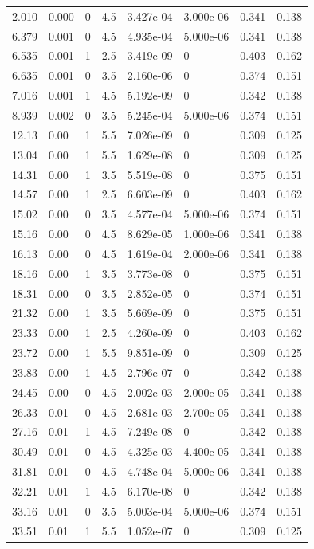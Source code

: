 \documentclass[preview]{standalone}
\begin{document}
{{\begin{tabular}{L{1.2cm}C{1.2cm} C{0.3cm}C{0.5cm} C{1.4cm}C{1.4cm} C{1.4cm}C{1.4cm}}
  2.010  &  0.000  & 0     & 4.5 &  3.427e-04  & 3.000e-06  & 0.341 &  0.138   \\ 
  6.379  &  0.001  & 0     & 4.5 &  4.935e-04  & 5.000e-06  & 0.341 &  0.138   \\ 
  6.535  &  0.001  & 1     & 2.5 &  3.419e-09  & 0  & 0.403 &  0.162   \\ 
  6.635  &  0.001  & 0     & 3.5 &  2.160e-06  & 0  & 0.374 &  0.151   \\ 
  7.016  &  0.001  & 1     & 4.5 &  5.192e-09  & 0  & 0.342 &  0.138   \\ 
  8.939  &  0.002  & 0     & 3.5 &  5.245e-04  & 5.000e-06  & 0.374 &  0.151   \\ 
  12.13  &  0.00  & 1     & 5.5 &  7.026e-09  & 0  & 0.309 &  0.125   \\ 
  13.04  &  0.00  & 1     & 5.5 &  1.629e-08  & 0  & 0.309 &  0.125   \\ 
  14.31  &  0.00  & 1     & 3.5 &  5.519e-08  & 0  & 0.375 &  0.151   \\ 
  14.57  &  0.00  & 1     & 2.5 &  6.603e-09  & 0  & 0.403 &  0.162   \\ 
  15.02  &  0.00  & 0     & 3.5 &  4.577e-04  & 5.000e-06  & 0.374 &  0.151   \\ 
  15.16  &  0.00  & 0     & 4.5 &  8.629e-05  & 1.000e-06  & 0.341 &  0.138   \\ 
  16.13  &  0.00  & 0     & 4.5 &  1.619e-04  & 2.000e-06  & 0.341 &  0.138   \\ 
  18.16  &  0.00  & 1     & 3.5 &  3.773e-08  & 0  & 0.375 &  0.151   \\ 
  18.31  &  0.00  & 0     & 3.5 &  2.852e-05  & 0  & 0.374 &  0.151   \\ 
  21.32  &  0.00  & 1     & 3.5 &  5.669e-09  & 0  & 0.375 &  0.151   \\ 
  23.33  &  0.00  & 1     & 2.5 &  4.260e-09  & 0  & 0.403 &  0.162   \\ 
  23.72  &  0.00  & 1     & 5.5 &  9.851e-09  & 0  & 0.309 &  0.125   \\ 
  23.83  &  0.00  & 1     & 4.5 &  2.796e-07  & 0  & 0.342 &  0.138   \\ 
  24.45  &  0.00  & 0     & 4.5 &  2.002e-03  & 2.000e-05  & 0.341 &  0.138   \\ 
  26.33  &  0.01  & 0     & 4.5 &  2.681e-03  & 2.700e-05  & 0.341 &  0.138   \\ 
  27.16  &  0.01  & 1     & 4.5 &  7.249e-08  & 0  & 0.342 &  0.138   \\ 
  30.49  &  0.01  & 0     & 4.5 &  4.325e-03  & 4.400e-05  & 0.341 &  0.138   \\ 
  31.81  &  0.01  & 0     & 4.5 &  4.748e-04  & 5.000e-06  & 0.341 &  0.138   \\ 
  32.21  &  0.01  & 1     & 4.5 &  6.170e-08  & 0  & 0.342 &  0.138   \\ 
  33.16  &  0.01  & 0     & 3.5 &  5.003e-04  & 5.000e-06  & 0.374 &  0.151   \\ 
  33.51  &  0.01  & 1     & 5.5 &  1.052e-07  & 0  & 0.309 &  0.125   \\ 
\hline 
\end{tabular} 

}}
\end{document}
